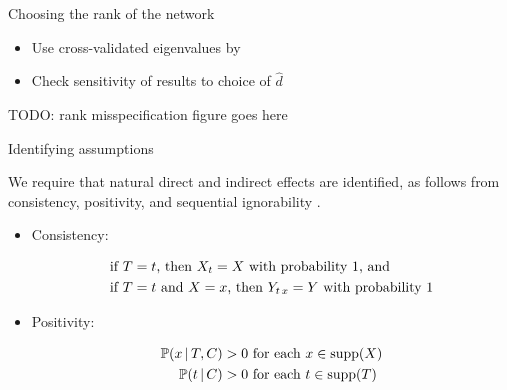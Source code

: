 \documentclass{beamer}
\theoremstyle{remark}
\begin{document}
\begin{frame}{Choosing the rank of the network}

    \begin{itemize}
        \item Use cross-validated eigenvalues by \cite{chen_estimating_2021}
        \item Check sensitivity of results to choice of $\widehat{d}$
    \end{itemize}

    TODO: rank misspecification figure goes here

\end{frame}

\begin{frame}{Identifying assumptions}

    We require that natural direct and indirect effects are identified, as follows from consistency, positivity, and sequential ignorability \citep{imai_identification_2010}.

    \begin{itemize}

        \item Consistency:

              \begin{equation*}
                  \begin{aligned}
                       & \text{if $T = t$, then $X_t = X$ with probability 1, and}               \\
                       & \text{if $T = t$ and $X = x$, then $Y_{t \, x} = Y$ with probability 1}
                  \end{aligned}
              \end{equation*}

        \item Positivity:

              \begin{equation*}
                  \begin{aligned}
                      \P[T, \C]{x} & > 0 \text{ for each }  x \in \supp(\X) \\
                      \P[\C]{t}    & > 0 \text{ for each }  t \in \supp(T)
                  \end{aligned}
              \end{equation*}

    \end{itemize}

\end{frame}
\end{document}

